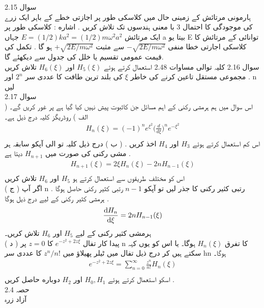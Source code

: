 \documentclass{book}
\begin{document}
سوال 
2.15\\
ہارمونی مرتائش کے زمینی حال میں کلاسکی طور پر اجازتی خطے کے باہر ایک زرے کی موجودگی کا احتمال 3 با معنی ہندسوں تک تلاش کریں .
اشاره : کلاسکی طور پر ایک مرتائش
\(E=(1/2)ka^{2}=(1/2)m\omega^{2}a^{2}\)
جہاں 
a
بیتا یو E توانائی کے مرتائش کا کلاسکی اجارتی خطا منفی
\(-\sqrt{2E/m\omega^{2}}\)
سے مثبت
\(+\sqrt{2E/m\omega^{2}}\)
ہو گا . تکمل کی قیمت عمومی تقسیم یا خلل کی جدول سے دیکھئے گا.\\
سوال 2.16
کلیہ توالی مساوات 2.48 استعمال کرتے ہوئے
\(H_{5}(\xi)\)
اور
\(H_{6}(\xi)\)
تلاش کریں . مجموعی مستقل تاعين کرنے کی خاطر
 \(\xi\) 
کی بلند ترین طافت کا عددی سر
\(2^{n}\)
اور
n
لیں\\
سوال 
2.17\\
اس سوال میں ہم ہرمشی رکنی کے اہم مسائل جن کاثبوت پیش نہیں کیا گیا ہے پر غور کریں گے۔
( الف ) روڈریگز کلیہ درج ذیل ہے۔
\begin{align*}
H_{n}(\xi)=(-1)^{n}e^{\xi^{2}}\big (\frac{d}{d\xi}\big )^{n}e^{-\xi^{2}}\\
\end{align*}
اس کم استعمال کرتے ہوئے
\(H_{3}\)
اور
\(H_{4}\)
اخذ کریں .
( ب ) درج ذیل کلیہ تو الی آپکو سابقہ ہر مشی رکنی کی صورت میں
\(H_{n+1}\)
دیتا ہے .
\begin{align*}
H_{n+1}(\xi)=2\xi H_{n}(\xi)-2nH_{n-1}(\xi)\\
\end{align*}
اس کو مختلف طریقوں سے استعمال کرتے ہو
\(H_{5}\)
اور
\(H_{6}\)
تلاش کریں\\
( ج )
اگر آپ n رتبی کثیر رکنی کا جذر لیں تو آپکو
\(n-1\)
رتبی کثیر رکنی حاصل ہوگا . ہرمشی کثیر رکنی کے لیے درج ذیل ہوگا .\\
\begin{align*}
\frac{\dif{H_{n}}}{\dif{\xi}}=2nH_{n-1}(\xi)\\
\end{align*}
ہرمشی کثیر رکنی کے لیے
\(H_{5}\)
اور
\(H_{6}\)
تلاش کریں۔\\
( د ) پیدا کار تفال
\(e^{-z^{2}+2z\xi}\)
کا
\(z=0\)
پر
n
کا تفرق
\(H_{n}(\xi)\)
ہوگا۔ یا اس کو یوں کہہ سکتے ہیں کر درج ذیل تفال میں ٹیلر پھیلاؤ میں
\(z^{n}/n!\)
کا عددی سر hn ہوگا۔
\begin{align*}
e^{-z^{2}+2z\xi}=\sum_{n=0}^{\infty}\frac{z^{n}}{n!}H_{n}(\xi)\\
\end{align*}
اسکو استعمال کرتے ہوئے
\(H_{0}, H_{1}\)
اور
\(H_{2}\)
دوباره حاصل کریں .\\
حصہ 
2.4\\
آزاد زرہ\\
\end{document}
